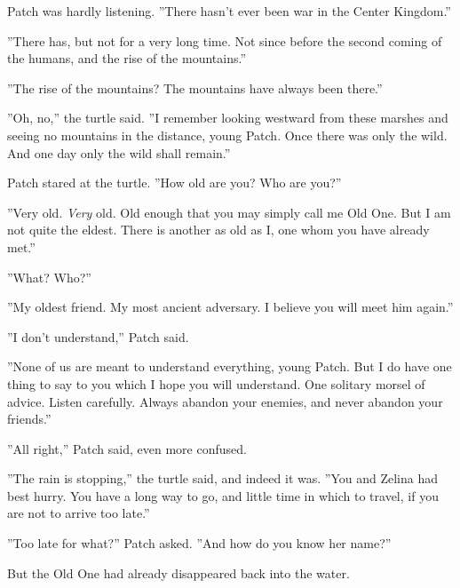 \documentclass[11pt]{article}
\begin{document}
 Patch was hardly listening. ''There hasn't ever been war in the Center Kingdom.''\par
 ''There has, but not for a very long time. Not since before the second coming of the humans, and the rise of the mountains.''\par
 ''The rise of the mountains? The mountains have always been there.''\par
 ''Oh, no,'' the turtle said. ''I remember looking westward from these marshes and seeing no mountains in the distance, young Patch. Once there was only the wild. And one day only the wild shall remain.''\par
 Patch stared at the turtle. ''How old are you? Who are you?''\par
 ''Very old. {\it Very} old. Old enough that you may simply call me Old One. But I am not quite the eldest. There is another as old as I, one whom you have already met.''\par
 ''What? Who?''\par
 ''My oldest friend. My most ancient adversary. I believe you will meet him again.''\par
 ''I don't understand,'' Patch said.\par
 ''None of us are meant to understand everything, young Patch. But I do have one thing to say to you which I hope you will understand. One solitary morsel of advice. Listen carefully. Always abandon your enemies, and never abandon your friends.''\par
 ''All right,'' Patch said, even more confused.\par
 ''The rain is stopping,'' the turtle said, and indeed it was. ''You and Zelina had best hurry. You have a long way to go, and little time in which to travel, if you are not to arrive too late.''\par
 ''Too late for what?'' Patch asked. ''And how do you know her name?''\par
 But the Old One had already disappeared back into the water.\par
\par
\end{document}
